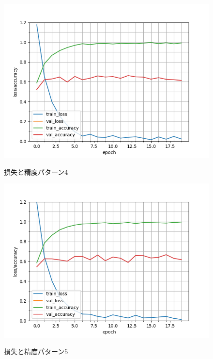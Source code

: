 \begin{figure}
	\begin{center}
		\includegraphics[scale=0.8]{./images/classify-model/loss_acuuracy_CNN_mel_4.png}
		\caption{損失と精度パターン4}
		\label{fig:CNNmel4}
		\includegraphics[scale=0.8]{./images/classify-model/loss_acuuracy_CNN_mel_5.png}
		\caption{損失と精度パターン5}
		\label{fig:CNNmel5}
	\end{center}
\end{figure}
